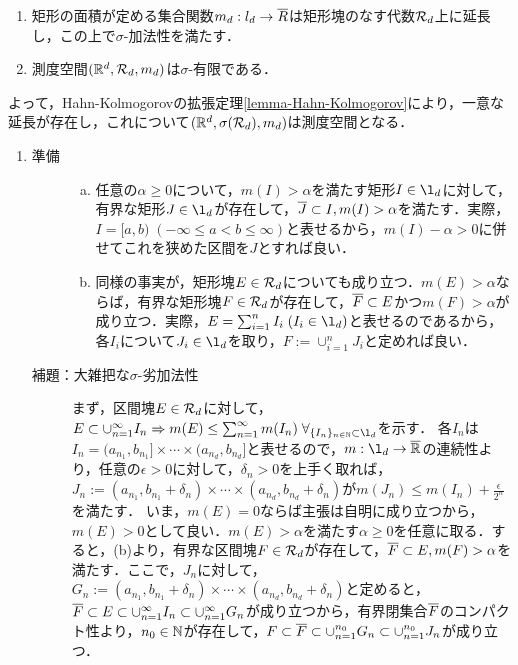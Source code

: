\documentclass[uplatex, dvipdfmx]{jsreport}
\begin{document}
\begin{lemma}[Lebesgue測度の存在と一意性]\mbox{}\label{lemma-Lebesgue-measure}
    \begin{enumerate}
        \item 矩形の面積が定める集合関数$m_d:l_d\to\overline{R}$は矩形塊のなす代数$\mathcal{R}_d$上に延長し，この上で$\sigma$-加法性を満たす．
        \item 測度空間$(\mathbb{R}^d,\mathcal{R}_d,m_d)$は$\sigma$-有限である．
    \end{enumerate}
    よって，Hahn-Kolmogorovの拡張定理\ref{lemma-Hahn-Kolmogorov}により，一意な延長が存在し，これについて$(\mathbb{R}^d,\sigma(\mathcal{R}_d),m_d)$は測度空間となる．
\end{lemma}
\begin{Proof}\mbox{}
    \begin{enumerate}
        \item \begin{description}
            \item[準備] \begin{enumerate}[(a)]
                \item 任意の$\alpha\ge 0$について，$m(I)>\alpha$を満たす矩形$I\in\l_d$に対して，有界な矩形$J\in\l_d$が存在して，$\overline{J}\subset I,m(I)>\alpha$を満たす．実際，$I=[a,b)\;(-\infty\le a<b\le\infty)$と表せるから，$m(I)-\alpha>0$に併せてこれを狭めた区間を$J$とすれば良い．
                \item 同様の事実が，矩形塊$E\in\mathcal{R}_d$についても成り立つ．$m(E)>\alpha$ならば，有界な矩形塊$F\in\mathcal{R}_d$が存在して，$\overline{F}\subset E$かつ$m(F)>\alpha$が成り立つ．実際，$E=\sum^n_{i=1}I_i\;(I_i\in\l_d)$と表せるのであるから，各$I_i$について$J_i\in\l_d$を取り，$F:=\cup_{i=1}^nJ_i$と定めれば良い．
            \end{enumerate}
            \item[補題：大雑把な$\sigma$-劣加法性] まず，区間塊$E\in\mathcal{R}_d$に対して，$E\subset\cupn I_n\Rightarrow m(E)\le\sumn m(I_n)\;\forall_{\{I_n\}_{n\in\N}\subset\l_d}$を示す．
            各$I_n$は$I_n=(a_{n_1},b_{n_1}]\times\cdots\times(a_{n_d},b_{n_d}]$と表せるので，$m:\l_d\to\o{\R}$の連続性より，任意の$\epsilon>0$に対して，$\delta_n>0$を上手く取れば，$J_n:=(a_{n_1},b_{n_1}+\delta_n)\times\cdots\times(a_{n_d},b_{n_d}+\delta_n)$が$m(J_n)\le m(I_n)+\frac{\epsilon}{2^n}$を満たす．
            いま，$m(E)=0$ならば主張は自明に成り立つから，$m(E)>0$として良い．$m(E)>\alpha$を満たす$\alpha\ge 0$を任意に取る．すると，(b)より，有界な区間塊$F\in\mathcal{R}_d$が存在して，$\overline{F}\subset E,m(F)>\alpha$を満たす．ここで，$J_n$に対して，$G_n:=(a_{n_1},b_{n_1}+\delta_n)\times\cdots\times(a_{n_d},b_{n_d}+\delta_n)$と定めると，$\overline{F}\subset E\subset\cup_{n=1}^\infty I_n\subset\cup_{n=1}^\infty G_n$が成り立つから，有界閉集合$\overline{F}$のコンパクト性より，$n_0\in\mathbb{N}$が存在して，$F\subset\overline{F}\subset\cup_{n=1}^{n_0}G_n\subset\cup_{n=1}^{n_0}J_n$が成り立つ．

\end{description}
\end{enumerate}
\end{Proof}
\end{document}
